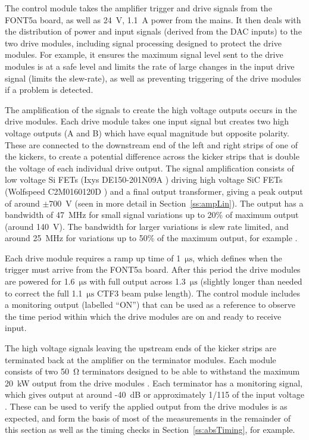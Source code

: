 The control module takes the amplifier trigger and drive signals from the FONT5a board, as well as 24~V, 1.1~A power from the mains.
It then deals with the distribution of power and input signals (derived from the DAC inputs) to the two drive modules, including signal processing designed to protect the drive modules. For example, it ensures the maximum signal level sent to the drive modules is at a safe level and limits the rate of large changes in the input drive signal (limits the slew-rate), as well as preventing triggering of the drive modules if a problem is detected.

The amplification of the signals to create the high voltage outputs occurs in the drive modules. Each drive module takes one input signal but creates two high voltage outputs (A and B) which have equal magnitude but opposite polarity. These are connected to the downstream end of the left and right strips of one of the kickers, to create a potential difference across the kicker strips that is double the voltage of each individual drive output. The signal amplification consists of low voltage Si FETs (Ixys DE150-201N09A \cite{ixysFET}) driving high voltage SiC FETs (Wolfspeed C2M0160120D \cite{wolfFET}) and a final output transformer, giving a peak output of around \(\pm700\)~V (seen in more detail in Section~\ref{ss:ampLin}). The output has a bandwidth of 47~MHz for small signal variations up to 20\% of maximum output (around 140~V). The bandwidth for larger variations is slew rate limited, and around 25~MHz for variations up to 50\% of the maximum output, for example \cite{colinCLIC16}.

Each drive module requires a ramp up time of 1~\(\mathrm{\mu s}\), which defines when the trigger must arrive from the FONT5a board. After this period the drive modules are powered for 1.6~\(\mathrm{\mu s}\)  with full output across 1.3~\(\mathrm{\mu s}\) (slightly longer than needed to correct the full 1.1~\(\mathrm{\mu s}\) CTF3 beam pulse length). The control module includes a monitoring output (labelled ``ON'') that can be used as a reference to observe the time period within which the drive modules are on and ready to receive input.

The high voltage signals leaving the upstream ends of the kicker strips are terminated back at the amplifier on the terminator modules. Each module consists of two 50~\(\mathrm{\Omega}\) terminators designed to be able to withstand the maximum 20~kW output from the drive modules \cite{colinCLIC16}. Each terminator has a monitoring signal, which gives output at around -40~dB or approximately 1/115 of the input voltage \cite{colinPriv}. These can be used to verify the applied output from the drive modules is as expected, and form the basis of most of the measurements in the remainder of this section as well as the timing checks in Section~\ref{ss:absTiming}, for example.

